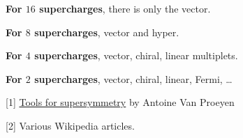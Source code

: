 \documentclass[10pt,letterpaper]{article}
\renewcommand{\section}[1]{\stepcounter{section}\medskip\pagebreak[1]\noindent\textbf{\large\arabic{section}.\ #1}\smallskip}
\renewcommand{\paragraph}[1]{\textbf{#1}}
\begin{document}
\paragraph{For $16$ supercharges}, there is only the vector.

\paragraph{For $8$ supercharges}, vector and hyper.

\paragraph{For $4$ supercharges}, vector, chiral, linear multiplets.

\paragraph{For $2$ supercharges}, vector, chiral, linear, Fermi, \ldots{}

%

\bigskip
\vfill
\setlength{\parindent}{0pt}



[1] \href{http://arxiv.org/abs/hep-th/9910030}{Tools for supersymmetry} by Antoine Van Proeyen

[2] Various Wikipedia articles.
\end{document}
